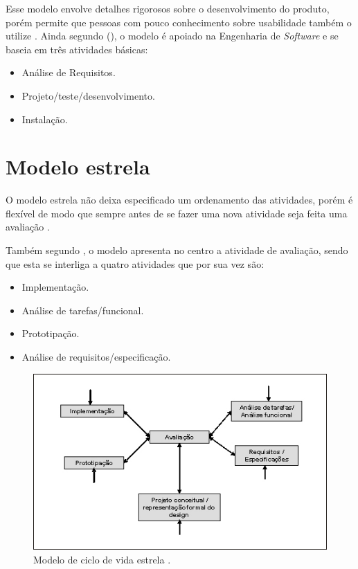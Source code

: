  Esse modelo envolve detalhes rigorosos sobre o desenvolvimento do produto, porém permite que pessoas com pouco conhecimento sobre usabilidade também o utilize \cite{ihc}. 
  Ainda segundo \citeauthor{ihc} (\citeyear{ihc}), o modelo é apoiado na Engenharia de \textit{Software} e se baseia
  em três atividades básicas:
  
  
  \begin{itemize}
    \item Análise de Requisitos.

    \item Projeto/teste/desenvolvimento.

    \item Instalação.     
  \end{itemize}  
  
  
  \section{Modelo estrela}
       
       O modelo estrela não deixa especificado um ordenamento das atividades, porém é flexível  de modo que sempre antes de se fazer uma nova atividade 
       seja feita uma avaliação \cite{guiaderef}.
       
       Também segundo \cite{guiaderef}, o modelo apresenta no centro a atividade de avaliação, sendo que esta se interliga a quatro atividades que 
       por sua vez são:
       
       \begin{itemize}
       \item Implementação.

       \item Análise de tarefas/funcional.

       \item Prototipação.
       
       \item Análise de requisitos/especificação.
       
       \end{itemize}
       
      \begin{figure}[!htb]
      \centering
      \includegraphics[scale=0.55]{figuras/estrela.jpg}
      \caption{Modelo de ciclo de vida estrela \cite{ciclovidaestrela}.}
      \end{figure}
    
